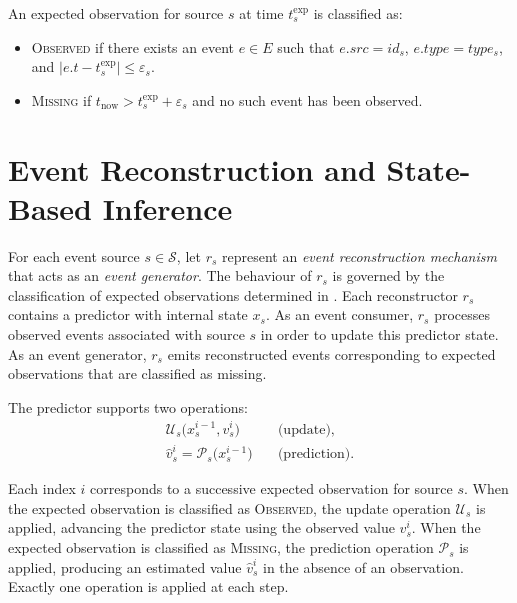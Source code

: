 An expected observation for source $s$ at time $t^{\mathrm{exp}}_s$ is classified as:
\begin{itemize}
    \item \textsc{Observed} if there exists an event $e \in E$ such that $e.src = id_s$, $e.type = type_s$, and $\lvert e.t - t^{\mathrm{exp}}_s \rvert \le \varepsilon_s$.
    \item \textsc{Missing} if $t_{\mathrm{now}} > t^{\mathrm{exp}}_s + \varepsilon_s$ and no such event has been observed.
\end{itemize}
\noindent




\section{Event Reconstruction and State-Based Inference}
\label{sec:state-based-inference}

For each event source $s \in \mathcal{S}$, let $r_s$ represent an \emph{event reconstruction mechanism} that acts as an \emph{event generator}. The behaviour of $r_s$ is governed by the classification of expected observations determined in .
Each reconstructor $r_s$ contains a predictor with internal state $x_s$. As an event consumer, $r_s$ processes observed events associated with source $s$ in order to update this predictor state. As an event generator, $r_s$ emits reconstructed events corresponding to expected observations that are classified as missing.

The predictor supports two operations:
\begin{align}
\mathcal{U}_s\bigl(x_s^{i-1}, v_s^{i}\bigr)
&\quad\text{(update)}, \\
\hat{v}_s^{i} = \mathcal{P}_s\bigl(x_s^{i-1}\bigr)
&\quad\text{(prediction)}.
\end{align}

Each index $i$ corresponds to a successive expected observation for source $s$. When the expected observation is classified as \textsc{Observed}, the update operation $\mathcal{U}_s$ is applied, advancing the predictor state using the observed value $v_s^{i}$. When the expected observation is classified as \textsc{Missing}, the prediction operation $\mathcal{P}_s$ is applied, producing an estimated value $\hat{v}_s^{i}$ in the absence of an observation. Exactly one operation is applied at each step.

